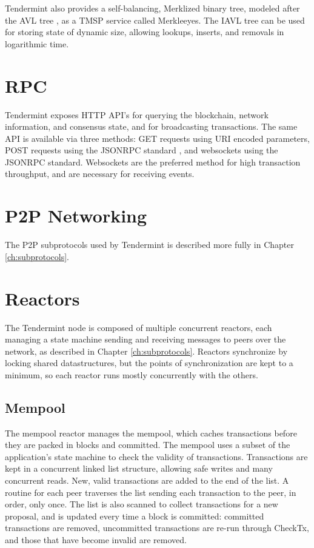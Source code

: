Tendermint also provides a self-balancing, Merklized binary tree, modeled after the AVL tree \cite{avl}, as a TMSP service called Merkleeyes.
The IAVL tree can be used for storing state of dynamic size, allowing lookups, inserts, and removals in logarithmic time.

\section{RPC}

Tendermint exposes HTTP API's for querying the blockchain, network information, and consensus state, and for broadcasting transactions.
The same API is available via three methods: GET requests using URI encoded parameters, POST requests using the JSONRPC standard \cite{jsonrpc}, 
and websockets using the JSONRPC standard. Websockets are the preferred method for high transaction throughput, 
and are necessary for receiving events.


\section{P2P Networking}

The P2P subprotocols used by Tendermint is described more fully in Chapter \ref{ch:subprotocols}.

\section{Reactors}

The Tendermint node is composed of multiple concurrent reactors, 
each managing a state machine sending and receiving messages to peers over the network, as described in Chapter \ref{ch:subprotocols}.
Reactors synchronize by locking shared datastructures, but the points of synchronization are kept to a minimum,
so each reactor runs mostly concurrently with the others.

\subsection{Mempool}

The mempool reactor manages the mempool, 
which caches transactions before they are packed in blocks and committed.
The mempool uses a subset of the application's state machine to check the validity of transactions.
Transactions are kept in a concurrent linked list structure, allowing safe writes and many concurrent reads.
New, valid transactions are added to the end of the list. 
A routine for each peer traverses the list sending each transaction to the peer, in order, only once.
The list is also scanned to collect transactions for a new proposal, 
and is updated every time a block is committed: committed transactions are removed, 
uncommitted transactions are re-run through CheckTx, and those that have become invalid are removed.

